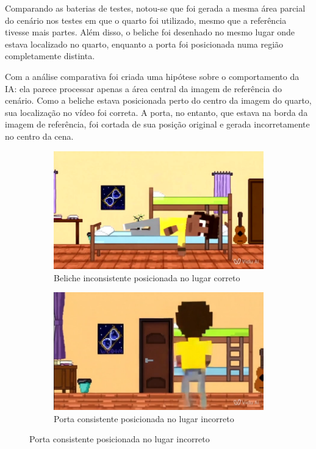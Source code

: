 Comparando as baterias de testes, notou-se que foi gerada a mesma área parcial do cenário nos testes em que o quarto foi utilizado, mesmo que a referência tivesse mais partes. Além disso, o beliche foi desenhado no mesmo lugar onde estava localizado no quarto, enquanto a porta foi posicionada numa região completamente distinta. 

Com a análise comparativa foi criada uma hipótese sobre o comportamento da IA: ela parece processar apenas a área central da imagem de referência do cenário. Como a beliche estava posicionada perto do centro da imagem do quarto, sua localização no vídeo foi correta. A porta, no entanto, que estava na borda da imagem de referência, foi cortada de sua posição original e gerada incorretamente no centro da cena.


\begin{figure}[htbp]
    \centering
    \caption{\small Comparação da geração dos objetos em relação ao quarto no Vidu}
    \label{fig:viduComparaLugar}
    \begin{subfigure}{0.4\linewidth}
        \includegraphics[width=1\linewidth]{figs/vidu/frame8.jpg}
        \caption{\small Beliche inconsistente posicionada no lugar correto}
        \label{fig:viduComparaBeliche}
    \end{subfigure}
    \begin{subfigure}{0.4\linewidth}
        \includegraphics[width=1\linewidth]{figs/vidu/frame11.PNG}
        \caption{\small Porta consistente posicionada no lugar incorreto}
        \label{fig:viduComparaPorta}
    \end{subfigure}
\end{figure}

